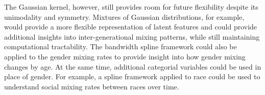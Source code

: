 The Gaussian kernel, however, still provides room for future flexibility despite its unimodality and symmetry. Mixtures of Gaussian distributions, for example, would provide a more flexible representation of latent features and could provide additional insights into inter-generational mixing patterns, while still maintaining computational tractability. The bandwidth spline framework could also be applied to the gender mixing rates to provide insight into how gender mixing changes by age. At the same time, additional categorial variables could be used in place of gender. For example, a spline framework applied to race could be used to understand social mixing rates between races over time.
